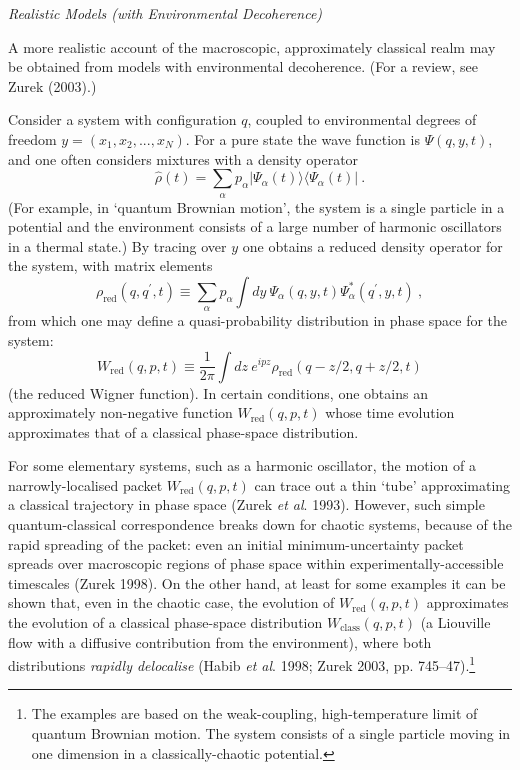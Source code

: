 \documentclass{article}%
\begin{document}
\begin{center}
\textit{Realistic Models (with Environmental Decoherence)}
\end{center}

A more realistic account of the macroscopic, approximately classical realm may
be obtained from models with environmental decoherence. (For a review, see
Zurek (2003).)

Consider a system with configuration $q$, coupled to environmental degrees of
freedom $y=(x_{1},x_{2},...,x_{N})$. For a pure state the wave function is
$\Psi(q,y,t)$, and one often considers mixtures with a density operator%
\[
\hat{\rho}(t)=\sum_{\alpha}p_{\alpha}|\Psi_{\alpha}(t)\rangle\langle
\Psi_{\alpha}(t)|\ .
\]
(For example, in `quantum Brownian motion', the system is a single particle in
a potential and the environment consists of a large number of harmonic
oscillators in a thermal state.) By tracing over $y$ one obtains a reduced
density operator for the system, with matrix elements%
\[
\rho_{\mathrm{red}}(q,q^{\prime},t)\equiv\sum_{\alpha}p_{\alpha}\int
dy\ \Psi_{\alpha}(q,y,t)\Psi_{\alpha}^{\ast}(q^{\prime},y,t)\ ,
\]
from which one may define a quasi-probability distribution in phase space for
the system:%
\[
W_{\mathrm{red}}(q,p,t)\equiv\frac{1}{2\pi}\int dz\ e^{ipz}\rho_{\mathrm{red}%
}(q-z/2,q+z/2,t)
\]
(the reduced Wigner function). In certain conditions, one obtains an
approximately non-negative function $W_{\mathrm{red}}(q,p,t)$ whose time
evolution approximates that of a classical phase-space distribution.

For some elementary systems, such as a harmonic oscillator, the motion of a
narrowly-localised packet $W_{\mathrm{red}}(q,p,t)$ can trace out a thin
`tube' approximating a classical trajectory in phase space (Zurek \textit{et
al}. 1993). However, such simple quantum-classical correspondence breaks down
for chaotic systems, because of the rapid spreading of the packet: even an
initial minimum-uncertainty packet spreads over macroscopic regions of phase
space within experimentally-accessible timescales (Zurek 1998). On the other
hand, at least for some examples it can be shown that, even in the chaotic
case, the evolution of $W_{\mathrm{red}}(q,p,t)$ approximates the evolution of
a classical phase-space distribution $W_{\mathrm{class}}(q,p,t)$ (a Liouville
flow with a diffusive contribution from the environment), where both
distributions \textit{rapidly delocalise} (Habib \textit{et al}. 1998; Zurek
2003, pp. 745--47).\footnote{The examples are based on the weak-coupling,
high-temperature limit of quantum Brownian motion. The system consists of a
single particle moving in one dimension in a classically-chaotic potential.}
\end{document}
